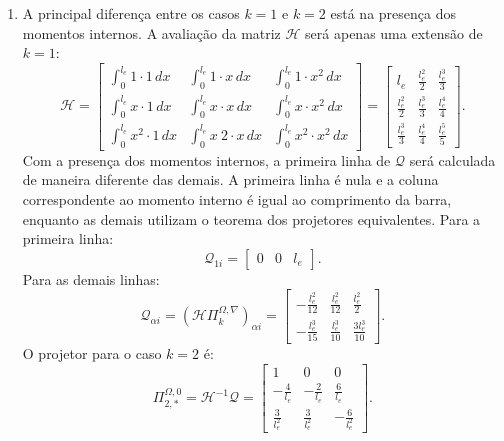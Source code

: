 \begin{tcolorbox}[breakable, colback=white, colframe=black, boxrule=0.4pt, arc=0pt, outer arc=0pt]
\begin{enumerate}[label=\alph*), leftmargin=*]
            \item A principal diferença entre os casos $k=1$ e $k=2$ está na presença dos momentos internos. A avaliação da matriz $\mathcal{H}$ será apenas uma extensão de $k=1$:
            $$\mathcal{H} = \begin{bmatrix} \int_0^{l_e} 1 \cdot 1 \, dx & \int_0^{l_e} 1 \cdot x \, dx & \int_0^{l_e} 1 \cdot x^2 \, dx \\ \int_0^{l_e} x \cdot 1 \, dx & \int_0^{l_e} x \cdot x \, dx & \int_0^{l_e} x \cdot x^2 \, dx \\ \int_0^{l_e} x^2 \cdot 1 \, dx & \int_0^{l_e} x~2 \cdot x \, dx & \int_0^{l_e} x^2 \cdot x^2 \, dx \end{bmatrix} = \begin{bmatrix} l_e &  \frac{l_e^2}{2} & \frac{l_e^3}{3} \\ \frac{l_e^2}{2} & \frac{l_e^3}{3} & \frac{l_e^4}{4} \\ \frac{l_e^3}{3} & \frac{l_e^4}{4} & \frac{l_e^5}{5} \end{bmatrix}.$$
            \indent Com a presença dos momentos internos, a primeira linha de $\mathcal{Q}$ será calculada de maneira diferente das demais. A primeira linha é nula e a coluna correspondente ao momento interno é igual ao comprimento da barra, enquanto as demais utilizam o teorema dos projetores equivalentes. Para a primeira linha:
            $$\mathcal{Q}_{1i} = \begin{bmatrix} 0 & 0 & l_e \end{bmatrix}.$$
            Para as demais linhas:
            $$\mathcal{Q}_{\alpha i} = \left(\mathcal{H}\Pi_k^{\Omega,\nabla}\right)_{\alpha i} = \begin{bmatrix} -\frac{l_e^2}{12} & \frac{l_e^2}{12} & \frac{l_e^2}{2} \\ -\frac{l_e^3}{15} & \frac{l_e^3}{10} & \frac{3l_e^3}{10}  \end{bmatrix}.$$
            \indent O projetor para o caso $k=2$ é:
            $$ \Pi_{2,*}^{\Omega,0} = \mathcal{H}^{-1} \mathcal{Q} = \begin{bmatrix} 1 & 0 & 0 \\ -\frac{4}{l_e} & -\frac{2}{l_e} & \frac{6}{l_e} \\ \frac{3}{l_e^2} & \frac{3}{l_e^2} & -\frac{6}{l_e^2} \end{bmatrix}.$$
        \end{enumerate}
        
        \vspace{2mm} %
    \end{tcolorbox}
\vspace{5mm}

